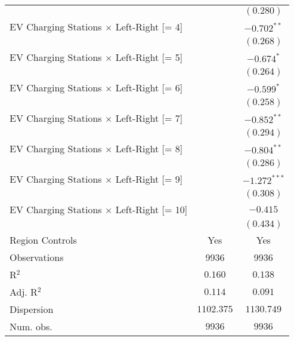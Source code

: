 \begin{center}
\begin{tiny}
\begin{longtable}{l@{} c@{} c@{}}
                                                         &                  & $(0.280)$        \\
\quad EV Charging Stations $\times$ Left-Right [= 4]     &                  & $-0.702^{**}$    \\
                                                         &                  & $(0.268)$        \\
\quad EV Charging Stations $\times$ Left-Right [= 5]     &                  & $-0.674^{*}$     \\
                                                         &                  & $(0.264)$        \\
\quad EV Charging Stations $\times$ Left-Right [= 6]     &                  & $-0.599^{*}$     \\
                                                         &                  & $(0.258)$        \\
\quad EV Charging Stations $\times$ Left-Right [= 7]     &                  & $-0.852^{**}$    \\
                                                         &                  & $(0.294)$        \\
\quad EV Charging Stations $\times$ Left-Right [= 8]     &                  & $-0.804^{**}$    \\
                                                         &                  & $(0.286)$        \\
\quad EV Charging Stations $\times$ Left-Right [= 9]     &                  & $-1.272^{***}$   \\
                                                         &                  & $(0.308)$        \\
\quad EV Charging Stations $\times$ Left-Right [= 10]    &                  & $-0.415$         \\
                                                         &                  & $(0.434)$        \\
\hline
Region Controls                                          & Yes              & Yes              \\
Observations                                             & 9936             & 9936             \\
R$^2$                                                    & $0.160$          & $0.138$          \\
Adj. R$^2$                                               & $0.114$          & $0.091$          \\
Dispersion                                               & $1102.375$       & $1130.749$       \\
Num. obs.                                                & $9936$           & $9936$           \\
\end{longtable}
\end{tiny}
\end{center}
